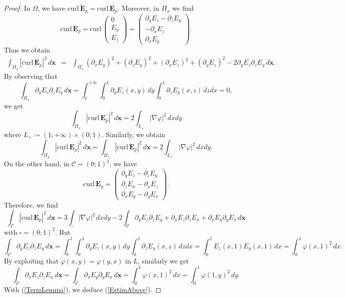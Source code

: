 \documentclass[10pt,a4paper]{amsart}
\def\E{\boldsymbol{E}}
\newcommand{\GL}{L}
\newcommand{\Om}{\Omega}
\newcommand{\bfx}{\boldsymbol{x}}
\newcommand{\curlvec}{\boldsymbol{\mrm{curl}}\,}
\newcommand{\dsp}{\displaystyle}
\newcommand{\mrm}[1]{\mathrm{#1}}
\begin{document}
\begin{proof}
In $\Om$, we have $\curlvec \tilde{\E}_p=\curlvec \E_p$. Moreover, in $\Pi_x$ we find
\[
\curlvec \E_p=\curlvec \left(\begin{array}{c}
0\\
E_y\\
E_z
\end{array}\right)=\left(\begin{array}{c}
\partial_yE_z-\partial_zE_y\\
-\partial_xE_z\\
\partial_xE_y
\end{array}\right).
\]
Thus we obtain
\[
\begin{array}{rcl}
\dsp\int_{\Pi_x}|\curlvec \E_p|^2\,d\bfx&=&\dsp\int_{\Pi_x}(\partial_xE_y)^2+(\partial_zE_y)^2+(\partial_xE_z)^2+(\partial_yE_z)^2-2\partial_yE_z\partial_zE_y\,d\bfx.
\end{array}
\]
By observing that 
\[
\dsp\int_{\Pi_x}\partial_yE_z\partial_zE_y\,d\bfx=\int_1^{+\infty}\int_0^1 \partial_yE_z(x,y)\,dy\int_0^1\partial_zE_y(x,z)\,dzdx=0,
\]
we get 
\[
\dsp\int_{\Pi_x}|\curlvec \E_p|^2\,d\bfx=2\int_{\GL_+}|
\nabla\varphi|^2\,dxdy
\]
where $\GL_+\coloneqq(1;+\infty)\times(0;1)$. Similarly, we obtain
\[
\dsp\int_{\Pi_y}|\curlvec \E_p|^2\,d\bfx=\dsp\int_{\Pi_z}|\curlvec \E_p|^2\,d\bfx=2\int_{\GL_+}|
\nabla\varphi|^2\,dxdy.
\]
On the other hand, in $\mathcal{C}=(0;1)^3$, we have
\[
\curlvec \E_p=\left(\begin{array}{c}
\partial_yE_z-\partial_zE_y\\
\partial_zE_x-\partial_xE_z\\
\partial_xE_y-\partial_yE_x
\end{array}\right).
\]
Therefore, we find
\begin{equation}\label{TermLemma}
\dsp\int_{\mathcal{C}}|\curlvec \E_p|^2\,d\bfx=3\int_{\square}|
\nabla\varphi|^2\,dxdy-2\dsp\int_{\mathcal{C}} \partial_yE_z\partial_zE_y+\partial_xE_z\partial_zE_x+\partial_xE_y\partial_yE_x\,d\bfx
\end{equation}
with $\square=(0;1)^2$. But 
\[
\dsp\int_{\mathcal{C}} \partial_yE_z\partial_zE_y\,d\bfx=\int_0^{1}\int_0^1 \partial_yE_z(x,y)\,dy\int_0^1\partial_zE_y(x,z)\,dzdx=\int_0^{1}E_z(x,1)E_y(x,1)\,dx=\int_0^1\varphi(x,1)^2\,dx.
\]
By exploiting that $\varphi(x,y)=\varphi(y,x)$ in $\GL$, similarly we get
\[
\dsp\int_{\mathcal{C}} \partial_xE_z\partial_zE_x\,d\bfx=\dsp\int_{\mathcal{C}} \partial_xE_y\partial_yE_x\,d\bfx=\int_0^1\varphi(x,1)^2\,dx=\int_0^1\varphi(1,y)^2\,dy.
\]
With (\ref{TermLemma}), we deduce (\ref{EstimAbove}).
\end{proof}
\end{document}
